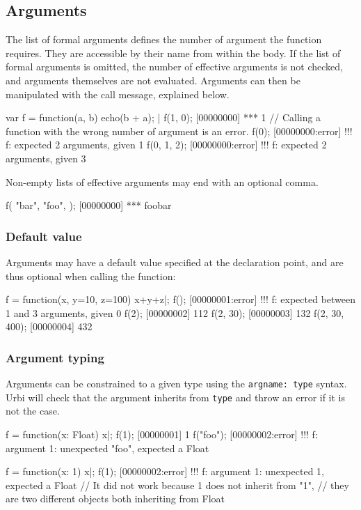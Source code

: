 \subsection{Arguments}

The list of formal arguments defines the number of argument the function
requires. They are accessible by their name from within the body. If the
list of formal arguments is omitted, the number of effective arguments is
not checked, and arguments themselves are not evaluated. Arguments can then
be manipulated with the call message, explained below.

\begin{urbiscript}
var f = function(a, b) {
  echo(b + a);
}|
f(1, 0);
[00000000] *** 1
// Calling a function with the wrong number of argument is an error.
f(0);
[00000000:error] !!! f: expected 2 arguments, given 1
f(0, 1, 2);
[00000000:error] !!! f: expected 2 arguments, given 3
\end{urbiscript}

Non-empty lists of effective arguments may end with an optional comma.
\begin{urbiscript}
f(
  "bar",
  "foo",
 );
[00000000] *** foobar
\end{urbiscript}

\subsubsection{Default value}

Arguments may have a default value specified at the declaration point, and
are thus optional when calling the function:

\begin{urbiscript}
f = function(x, y=10, z=100) { x+y+z}|;
f();
[00000001:error] !!! f: expected between 1 and 3 arguments, given 0
f(2);
[00000002] 112
f(2, 30);
[00000003] 132
f(2, 30, 400);
[00000004] 432
\end{urbiscript}

\subsubsection{Argument typing}
\label{sec:lang:argtype}
Arguments can be constrained to a given type using the \lstinline{argname: type}
syntax. Urbi will check that the argument inherits from \lstinline{type} and
throw an error if it is not the case.

\begin{urbiscript}
f = function(x: Float) {x}|;
f(1);
[00000001] 1
f("foo");
[00000002:error] !!! f: argument 1: unexpected "foo", expected a Float

f = function(x: 1) {x}|;
f(1);
[00000002:error] !!! f: argument 1: unexpected 1, expected a Float
// It did not work because 1 does not inherit from "1",
// they are two different objects both inheriting from Float

\end{urbiscript}


